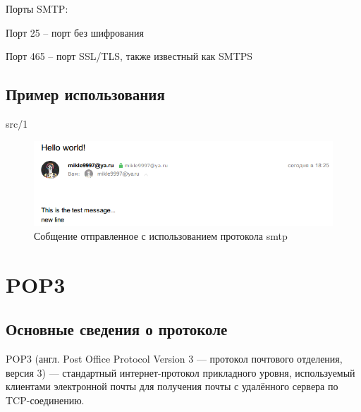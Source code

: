 Порты SMTP:

    Порт 25 – порт без шифрования
    
    Порт 465 – порт SSL/TLS, также известный как SMTPS

\subsection{Пример использования}
 {src/1}

\begin{figure}[H]
	\begin{center}
		\includegraphics[scale=0.7]{pics/smtp_test.png}
		\caption{Собщение отправленное с использованием протокола smtp}
		\label{clientTCP}
	\end{center}
\end{figure}

\section{POP3}

\subsection{Основные сведения о протоколе}
POP3 (англ. Post Office Protocol Version 3 — протокол почтового отделения, версия 3) — стандартный интернет-протокол прикладного уровня, используемый клиентами электронной почты для получения почты с удалённого сервера по TCP-соединению. 

